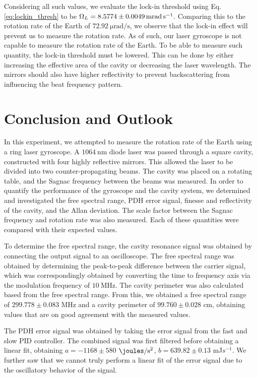 \documentclass[a4paper]{report}
\numberwithin{equation}{section}
\begin{document}
Considering all such values, we evaluate the lock-in threshold using Eq. \ref{eq:lockin_thresh} to be $\Omega_L = \SI{8.5774 +- 0.0049}{\milli\radian\per\second}$. 
Comparing this to the rotation rate of the Earth of $\SI{72.92}{\micro\radian\per\second}$, we observe that the lock-in effect will 
prevent us to measure the rotation rate. As of such, our laser gyroscope is not capable to measure the rotation rate of the Earth. To be 
able to measure such quantity, the lock-in threshold must be lowered. This can be done by either increasing the effective area of 
the cavity or decreasing the laser wavelength. The mirrors should also have higher reflectivity to prevent backscattering 
from influencing the beat frequency pattern.\par 


\chapter{Conclusion and Outlook}

In this experiment, we attempted to measure the rotation rate of the Earth using a ring laser gyroscope. A $\SI{1064}{\nano\meter}$ diode laser was 
passed through a square cavity, constructed with four highly reflective mirrors. This allowed the laser to be divided into two counter-propagating beams. The cavity was placed on a rotating table, and the Sagnac frequency between the beams was measured. In order to quantify the performance of the gyroscope and the cavity system, we determined and investigated the free spectral range, PDH error signal, finesse and reflectivity of the cavity, and the Allan deviation. The scale factor between the Sagnac frequency and rotation rate was also measured. Each of these quantities were compared with their expected values.\par 

To determine the free spectral range, the cavity resonance signal was obtained by connecting the output signal to an oscilloscope. The free spectral range was obtained by determining the peak-to-peak difference between the carrier signal, which was correspondingly obtained by converting the time to frequency axis via the modulation frequency of $\SI{10}{\mega\hertz}$. The cavity perimeter was also calculated based from the free spectral range. From this, we obtained a free spectral range of $299.778 \pm 0.083$ MHz and a cavity perimeter of $99.760 \pm 0.028$ cm, obtaining values that are on good agreement with the measured values.

The PDH error signal was obtained by taking the error signal from the fast and slow PID controller. The combined signal was first filtered before obtaining a linear fit, obtaining $a = −1168 \pm 580$ $\si{\joules\per\second\squared}$, $b = 639.82 \pm 0.13$ mJ$s^{-1}$. We further saw that we cannot truly perform a linear fit of the error signal due to the oscillatory behavior of the signal.
\end{document}
